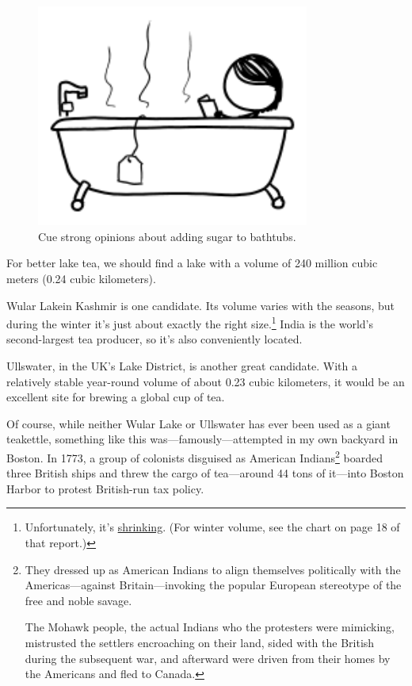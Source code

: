 {\begin{figure}[!htbp]
\centering
\includegraphics[scale=0.5, max width=0.8\textwidth]{imgs/a/79/tea_bathtub.png}
\caption{Cue strong opinions about adding sugar to bathtubs.}
\end{figure}

{For better lake tea, we should find a lake with a volume of 240 million cubic meters (0.24 cubic kilometers).}

{Wular Lakein Kashmir is one candidate. Its volume varies with the seasons, but during the winter it's just about exactly the right size.{\footnote{Unfortunately, it's \href{http://www.ramsar.org/pdf/wurc/wurc\_mgtplan\_india\_wular.pdf}{shrinking}. (For winter volume, see the chart on page 18 of that report.)} } India is the world's second-largest tea producer, so it's also conveniently located.}

{Ullswater, in the UK's Lake District, is another great candidate. With a relatively stable year-round volume of about 0.23 cubic kilometers, it would be an excellent site for brewing a global cup of tea.}

{Of course, while neither Wular Lake or Ullswater has ever been used as a giant teakettle, something like this was—famously—attempted in my own backyard in Boston. In 1773, a group of colonists disguised as American Indians{\footnote{They dressed up as American Indians to align themselves politically with the Americas—against Britain—invoking the popular European stereotype of the free and noble savage.

The Mohawk people, the actual Indians who the protesters were mimicking, mistrusted the settlers encroaching on their land, sided with the British during the subsequent war, and afterward were driven from their homes by the Americans and fled to Canada.} } boarded three British ships and threw the cargo of tea—around 44 tons of it—into Boston Harbor to protest British-run tax policy.}

}
